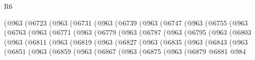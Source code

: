\begin{lexlean}{R6}
\begin{coremodule}
          (@963
            (@6723
              (@963
                (@6731
                  (@963
                    (@6739
                      (@963
                        (@6747
                          (@963
                            (@6755
                              (@963
                                (@6763
                                  (@963
                                    (@6771
                                      (@963
                                        (@6779
                                          (@963
                                            (@6787
                                              (@963
                                                (@6795
                                                  (@963
                                                    (@6803
                                                      (@963
                                                        (@6811
                                                          (@963
                                                            (@6819
                                                              (@963
                                                                (@6827
                                                                  (@963
                                                                    (@6835
                                                                      (@963
                                                                        (@6843
                                                                          (@963
                                                                            (@6851
                                                                              (@963
                                                                                (@6859
                                                                                  (@963
                                                                                    (@6867
                                                                                      (@963
                                                                                        (@6875
                                                                                          (@963
                                                                                            (@6879
                                                                                              @6881
                                                                                              @984

\end{coremodule}
\end{lexlean}
